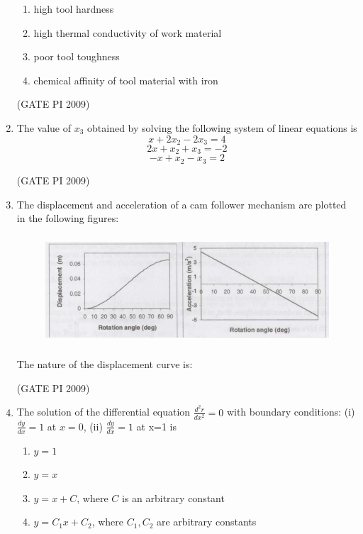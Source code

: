 \documentclass[journal,12pt,onecolumn]{IEEEtran}
\theoremstyle{remark}
\begin{document}
\begin{enumerate}[label=Q.\arabic*]
\begin{enumerate}[label=(\Alph*)]
\item high tool hardness
\item high thermal conductivity of work material
\item poor tool toughness
\item chemical affinity of tool material with iron
\end{enumerate}
\hfill (GATE PI 2009)
\item The value of $x_3$ obtained by solving the following system of linear equations is
$$x + 2x_2 - 2x_3 = 4$$ 
$$2x + x_2 + x_3 = -2 $$
$$-x + x_2 - x_3 = 2$$
\begin{enumerate}[label=(\Alph*)]
\end{enumerate}
\hfill (GATE PI 2009)
\item The displacement and acceleration of a cam follower mechanism are plotted in the following figures:
\begin{figure}[h]
    \centering
    \includegraphics[height=11em,width=1\linewidth]{figs/1.png}
    \label{fig:placeholder}
\end{figure} 
The nature of the displacement curve is:
\begin{enumerate}[label=(\Alph*)]
\end{enumerate}
\hfill (GATE PI 2009)
\item The solution of the differential equation
$
\frac{d^2 r}{dx^2} = 0
$
with boundary conditions: (i) $\frac{dy}{dx} = 1$ at $x = 0$, (ii) $\frac{dy}{dx} = 1$ at x=1 is
\begin{enumerate}[label=(\Alph*)]
\item $y = 1$ 
\item $y = x$ 
\item $y = x + C$, where $C$ is an arbitrary constant  
\item $y = C_1 x + C_2$, where $C_1, C_2$ are arbitrary constants 


\end{enumerate}
\end{enumerate}
\end{document}
